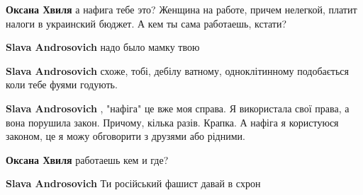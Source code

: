 \begin{itemize}
\begin{itemize}
 
\textbf{Оксана Хвиля} а нафига тебе это? Женщина на работе, причем нелегкой, платит налоги в украинский бюджет.
А кем ты сама работаешь, кстати?

 
\textbf{Slava Androsovich} надо было мамку твою

 
\textbf{Slava Androsovich} схоже, тобі, дебілу ватному, одноклітинному подобається коли тебе фуями годують.

 
\textbf{Slava Androsovich} , "нафіга" це вже моя справа. Я використала свої
права, а вона порушила закон. Причому, кілька разів. Крапка. А нафіга я
користуюся законом, це я можу обговорити з друзями або рідними.

 
\textbf{Оксана Хвиля} работаешь кем и где?

 
\textbf{Slava Androsovich} Ти російський фашист давай в схрон


\end{itemize}
\end{itemize}
